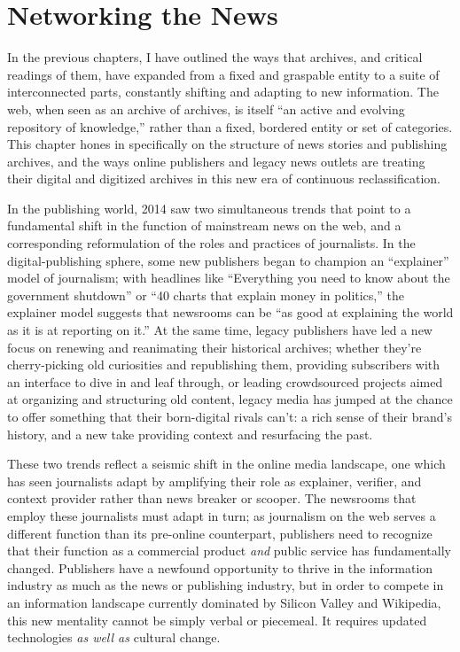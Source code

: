 \chapter{Networking the News}

In the previous chapters, I have outlined the ways that archives, and critical readings of them, have expanded from a fixed and graspable entity to a suite of interconnected parts, constantly shifting and adapting to new information. The web, when seen as an archive of archives, is itself ``an active and evolving repository of knowledge,'' rather than a fixed, bordered entity or set of categories.\autocite[2]{chakrabarti_mining_2003} This chapter hones in specifically on the structure of news stories and publishing archives, and the ways online publishers and legacy news outlets are treating their digital and digitized archives in this new era of continuous reclassification.

In the publishing world, 2014 saw two simultaneous trends that point to a fundamental shift in the function of mainstream news on the web, and a corresponding reformulation of the roles and practices of journalists. In the digital-publishing sphere, some new publishers began to champion an ``explainer'' model of journalism; with headlines like ``Everything you need to know about the government shutdown'' or ``40 charts that explain money in politics,'' the explainer model suggests that newsrooms can be ``as good at explaining the world as it is at reporting on it.''\autocite{klein_vox_2014} At the same time, legacy publishers have led a new focus on renewing and reanimating their historical archives; whether they're cherry-picking old curiosities and republishing them, providing subscribers with an interface to dive in and leaf through, or leading crowdsourced projects aimed at organizing and structuring old content, legacy media has jumped at the chance to offer something that their born-digital rivals can't: a rich sense of their brand's history, and a new take providing context and resurfacing the past.

These two trends reflect a seismic shift in the online media landscape, one which has seen journalists adapt by amplifying their role as explainer, verifier, and context provider rather than news breaker or scooper. The newsrooms that employ these journalists must adapt in turn; as journalism on the web serves a different function than its pre-online counterpart, publishers need to recognize that their function as a commercial product \emph{and} public service has fundamentally changed. Publishers have a newfound opportunity to thrive in the information industry as much as the news or publishing industry, but in order to compete in an information landscape currently dominated by Silicon Valley and Wikipedia, this new mentality cannot be simply verbal or piecemeal. It requires updated technologies \emph{as well as} cultural change.

